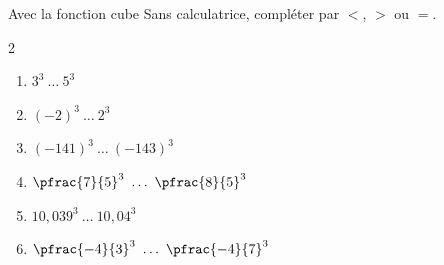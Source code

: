 \begin{exo}{Avec la fonction cube}
	Sans calculatrice, compléter par $<$, $>$ ou $=$.
	\vspace*{-2mm}
	\begin{multicols}{2}
	\begin{enumerate}[itemsep=2mm]
		\item $3^3 \ \dots \ 5^3$
		\item $(-2)^3 \ \dots \ 2^3$
		\item $(-141)^3 \ \dots \ (-143)^3$
		\item $\pfrac{7}{5}^3 \ \dots \ \pfrac{8}{5}^3$
		\item $10,039^3 \ \dots \ 10,04^3$
		\item $\pfrac{-4}{3}^3 \ \dots \ \pfrac{-4}{7}^3$
	\end{enumerate}
	\end{multicols}\vspace*{-2mm}
\end{exo}
